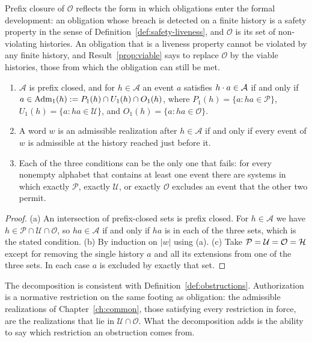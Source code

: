 Prefix closure of $\mathcal O$ reflects the form in which obligations enter the formal development: an obligation whose breach is detected on a finite history is a safety property in the sense of Definition~\ref{def:safety-liveness}, and $\mathcal O$ is its set of non-violating histories. An obligation that is a liveness property cannot be violated by any finite history, and Result~\ref{prop:viable} says to replace $\mathcal O$ by the viable histories, those from which the obligation can still be met.

\begin{newresult}\label{prop:stepwise}
\begin{enumerate}[nosep,label=(\alph*)]
  \item $\mathcal A$ is prefix closed, and for $h\in\mathcal A$ an event $a$ satisfies $h\cdot a\in\mathcal A$ if and only if $a\in\operatorname{Adm}_1(h):=P_1(h)\cap U_1(h)\cap O_1(h)$, where $P_1(h)=\{a:ha\in\mathcal P\}$, $U_1(h)=\{a:ha\in\mathcal U\}$, and $O_1(h)=\{a:ha\in\mathcal O\}$.
  \item A word $w$ is an admissible realization after $h\in\mathcal A$ if and only if every event of $w$ is admissible at the history reached just before it.
  \item Each of the three conditions can be the only one that fails: for every nonempty alphabet that contains at least one event there are systems in which exactly $\mathcal P$, exactly $\mathcal U$, or exactly $\mathcal O$ excludes an event that the other two permit.
\end{enumerate}
\end{newresult}
\begin{proof}
(a) An intersection of prefix-closed sets is prefix closed. For $h\in\mathcal A$ we have $h\in\mathcal P\cap\mathcal U\cap\mathcal O$, so $ha\in\mathcal A$ if and only if $ha$ is in each of the three sets, which is the stated condition. (b) By induction on $|w|$ using (a). (c) Take $\mathcal P=\mathcal U=\mathcal O=\mathcal{H}$ except for removing the single history $a$ and all its extensions from one of the three sets. In each case $a$ is excluded by exactly that set.
\end{proof}

The decomposition is consistent with Definition~\ref{def:obstructions}. Authorization is a normative restriction on the same footing as obligation: the admissible realizations of Chapter~\ref{ch:common}, those satisfying every restriction in force, are the realizations that lie in $\mathcal U\cap\mathcal O$. What the decomposition adds is the ability to say which restriction an obstruction comes from.

